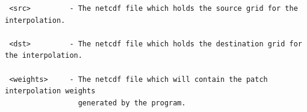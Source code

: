 \begin{verbatim}
 <src>         - The netcdf file which holds the source grid for the interpolation. 
 
 <dst>         - The netcdf file which holds the destination grid for the interpolation. 

 <weights>     - The netcdf file which will contain the patch interpolation weights 
                 generated by the program.

\end{verbatim}


\newpage






